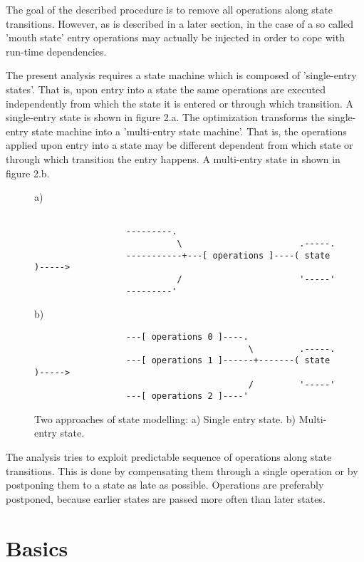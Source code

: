 \documentclass[12pt]{article}
\begin{document}
     
The goal of the described procedure is to remove all operations along state
transitions. However, as is described in a later section, in the case of a 
so called 'mouth state' entry operations may actually be injected in order
to cope with run-time dependencies.

The present analysis requires a state machine which is composed of
'single-entry states'. That is, upon entry into a state the same operations are
executed independently from which the state it is entered or through which
transition.  A single-entry state is shown in figure 2.a. The optimization
transforms the single-entry state machine into a 'multi-entry state machine'.
That is, the operations applied upon entry into a state may be different
dependent from which state or through which transition the entry happens.  A
multi-entry state in shown in figure 2.b.

\begin{figure}[htbp] \leavevmode
a)

\begin{verbatim}
     
                  ---------.
                            \                       .-----.
                  -----------+---[ operations ]----( state )----->   
                            /                       '-----'
                  ---------'       
\end{verbatim}
     
b)
     
\begin{verbatim}
                  ---[ operations 0 ]----.
                                          \         .-----.
                  ---[ operations 1 ]------+-------( state )----->  
                                          /         '-----'
                  ---[ operations 2 ]----'       

\end{verbatim}
\caption{Two approaches of state modelling: a) Single entry state. 
b) Multi-entry state.}
\end{figure}

The analysis tries to exploit predictable sequence of operations along state
transitions. This is done by compensating them through a single operation or by
postponing them to a state as late as possible.  Operations are preferably
postponed, because earlier states are passed more often than later states.

\section{Basics}
\end{document}
